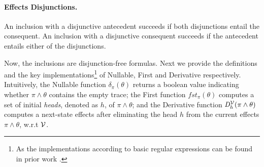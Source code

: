 \documentclass[acmsmall,10pt,review]{acmart}
\newcommand{\env}{\code{\mathcal{V}}}
\newcommand{\es}{\theta}
\newcommand{\code}[1]{{\tt{\ensuremath{\m{#1}}}}}
\newcommand{\empt}{\textcolor{black}{\ensuremath{\epsilon}}}
\newcommand{\m}{\mathit}
\begin{document}
{\paragraph{\textbf{Effects Disjunctions.}}
An inclusion with a disjunctive antecedent succeeds if both disjunctions entail the consequent.  An inclusion with a disjunctive consequent succeeds if the antecedent entails either of the disjunctions.  
{ 

}

Now, the inclusions are disjunction-free formulas. 
Next we provide the definitions and the key implementations\footnote{As 
the implementations according to basic regular expressions can be found 
in prior work \cite{DBLP:conf/fsttcs/KeilT14}. 
} of Nullable, First and Derivative respectively. Intuitively, 
the Nullable function \code{\delta_{{\pi}}(\es)} returns a boolean 
value indicating whether \code{{\pi} \wedge \es} contains the empty 
trace; the First function \code{fst_{{\pi}}( \es)} computes a set of 
 initial \emph{heads}, denoted as \code{h},  of \code{{\pi} \wedge \es}; and the Derivative 
function \code{D^{\env}_{h}(\pi \wedge \es)} computes a next-state 
effects after eliminating the head  \code{h} from the current 
effects \code{{\pi} \wedge \es}, w.r.t \code{\env}. 

%


}
\end{document}
